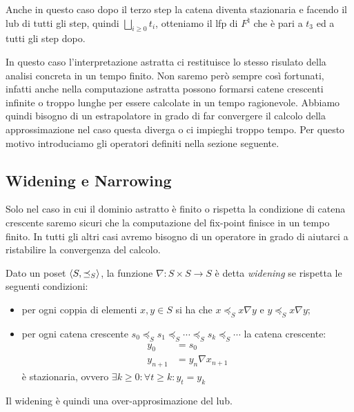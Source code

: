 Anche in questo caso dopo il terzo step la catena diventa stazionaria e facendo il lub di tutti gli step, quindi \(\bigsqcup_{i\geq0}t_i\), otteniamo il lfp di \(F^{\natural}\) che è pari a \(t_3\) ed a tutti gli step dopo.

In questo caso l'interpretazione astratta ci restituisce lo stesso risulato della analisi concreta in un tempo finito. Non saremo però sempre così fortunati, infatti anche nella computazione astratta possono formarsi catene crescenti infinite o troppo lunghe per essere calcolate in un tempo ragionevole. Abbiamo quindi bisogno di un estrapolatore in grado di far convergere il calcolo della approssimazione nel caso questa diverga o ci impieghi troppo tempo. Per questo motivo introduciamo gli operatori definiti nella sezione seguente.

\subsection{Widening e Narrowing}
Solo nel caso in cui il dominio astratto è finito o rispetta la condizione di catena crescente saremo sicuri che la computazione del fix-point finisce in un tempo finito. In tutti gli altri casi avremo bisogno di un operatore in grado di aiutarci a ristabilire la convergenza del calcolo.

\begin{definition}[Widening]
Dato un poset \(\langle S, \preceq_{S}\rangle\), la funzione \(\nabla:S\times S\rightarrow S\) è detta \textit{widening} se rispetta le seguenti condizioni:
\begin{itemize}
	\item per ogni coppia di elementi \(x, y\in S\) si ha che \(x\preceq_S x\nabla y\) e \(y\preceq_S x\nabla y\);
	\item per ogni catena crescente \(s_0\preceq_S s_1\preceq_S\cdots\preceq_S s_k\preceq_S\cdots\) la catena crescente: 
	\begin{align*}
	y_0 &= s_0\\
	y_{n+1} &= y_n\nabla x_{n+1}
	\end{align*}
	è stazionaria, ovvero \(\exists k\ge 0:\forall t\geq k: y_t = y_k\)
\end{itemize}
\end{definition}
Il widening è quindi una over-approsimazione del lub. 

